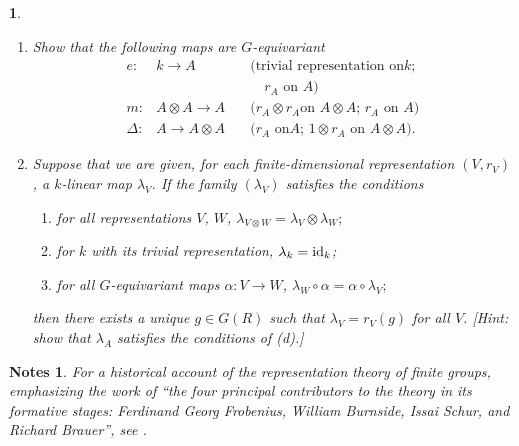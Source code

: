 \documentclass[a4paper,11pt,final,openany]{memoir}%
\newtheorem*{nt}{Notes}
\newtheorem{exercise}[Y]{}
\theoremstyle{nonumberplain}
\begin{document}
\begin{exercise}
\begin{enumerate}
\item Show that the following maps are $G$-equivariant%
\begin{align*}
e\colon &  k\rightarrow A & \quad\text{(trivial representation on
}k\text{;}\\
& & \qquad r_{A}\text{ on }A)\\
m\colon &  A\otimes A\rightarrow A & \quad\text{(}r_{A}\otimes r_{A}\text{
on }A\otimes A\text{; }r_{A}\text{ on }A)\\
\Delta\colon &  A\rightarrow A\otimes A & \quad\text{(}r_{A}\text{ on
}A\text{; }1\otimes r_{A}\text{ on }A\otimes A).
\end{align*}


\item Suppose that we are given, for each finite-dimensional representation
$(V,r_{V})$, a $k$-linear map $\lambda_{V}$. If the family $(\lambda_{V})$
satisfies the conditions

\begin{enumerate}
\item for all representations $V$, $W$, $\lambda_{V\otimes W}=\lambda
_{V}\otimes\lambda_{W};$

\item for $k$ with its trivial representation, $\lambda_{k}=\operatorname{id}_{k}$;

\item for all $G$-equivariant maps $\alpha\colon V\rightarrow W$, $\lambda
_{W}\circ\alpha=\alpha\circ\lambda_{V};$
\end{enumerate}

\noindent then there exists a unique $g\in G(R)$ such that $\lambda_{V}%
=r_{V}(g)$ for all $V$. [Hint: show that $\lambda_{A}$ satisfies the
conditions of (d).]
\end{enumerate}
\end{exercise}

\begin{nt}
For a historical account of the representation theory of finite groups,
emphasizing the work of \textquotedblleft the four principal contributors to
the theory in its formative stages: Ferdinand Georg Frobenius, William
Burnside, Issai Schur, and Richard Brauer\textquotedblright, see
\cite{curtis1999}.
\end{nt}
\end{document}
